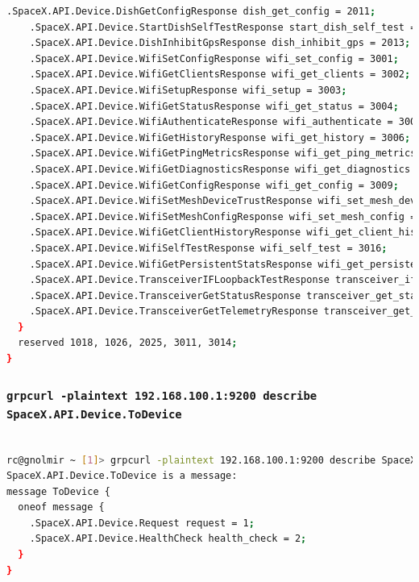 \documentclass[IN,11pt,twoside,openright,idp,english]{tumthesis}
\begin{document}
\begin{lstlisting}[language=bash,basicstyle=\tiny]
    .SpaceX.API.Device.DishGetConfigResponse dish_get_config = 2011;
    .SpaceX.API.Device.StartDishSelfTestResponse start_dish_self_test = 2012;
    .SpaceX.API.Device.DishInhibitGpsResponse dish_inhibit_gps = 2013;
    .SpaceX.API.Device.WifiSetConfigResponse wifi_set_config = 3001;
    .SpaceX.API.Device.WifiGetClientsResponse wifi_get_clients = 3002;
    .SpaceX.API.Device.WifiSetupResponse wifi_setup = 3003;
    .SpaceX.API.Device.WifiGetStatusResponse wifi_get_status = 3004;
    .SpaceX.API.Device.WifiAuthenticateResponse wifi_authenticate = 3005;
    .SpaceX.API.Device.WifiGetHistoryResponse wifi_get_history = 3006;
    .SpaceX.API.Device.WifiGetPingMetricsResponse wifi_get_ping_metrics = 3007;
    .SpaceX.API.Device.WifiGetDiagnosticsResponse wifi_get_diagnostics = 3008;
    .SpaceX.API.Device.WifiGetConfigResponse wifi_get_config = 3009;
    .SpaceX.API.Device.WifiSetMeshDeviceTrustResponse wifi_set_mesh_device_trust = 3012;
    .SpaceX.API.Device.WifiSetMeshConfigResponse wifi_set_mesh_config = 3013 [deprecated = true];
    .SpaceX.API.Device.WifiGetClientHistoryResponse wifi_get_client_history = 3015;
    .SpaceX.API.Device.WifiSelfTestResponse wifi_self_test = 3016;
    .SpaceX.API.Device.WifiGetPersistentStatsResponse wifi_get_persistent_stats = 3022;
    .SpaceX.API.Device.TransceiverIFLoopbackTestResponse transceiver_if_loopback_test = 4001;
    .SpaceX.API.Device.TransceiverGetStatusResponse transceiver_get_status = 4003;
    .SpaceX.API.Device.TransceiverGetTelemetryResponse transceiver_get_telemetry = 4004;
  }
  reserved 1018, 1026, 2025, 3011, 3014;
}
\end{lstlisting}

\subsubsection{\texttt{grpcurl -plaintext 192.168.100.1:9200 describe SpaceX.API.Device.ToDevice}}

\begin{lstlisting}[language=bash,basicstyle=\tiny]

rc@gnolmir ~ [1]> grpcurl -plaintext 192.168.100.1:9200 describe SpaceX.API.Device.ToDevice
SpaceX.API.Device.ToDevice is a message:
message ToDevice {
  oneof message {
    .SpaceX.API.Device.Request request = 1;
    .SpaceX.API.Device.HealthCheck health_check = 2;
  }
}

\end{lstlisting}
\end{document}
